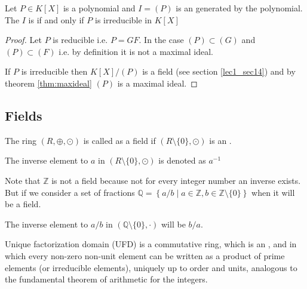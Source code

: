 \begin{appendices}
\begin{theorem}
  Let $P \in K\left[X\right]$ is a polynomial and $I = \left(P\right)$ is
  an  generated by the polynomial. The $I$ is
   if and only if $P$ is irreducible in
  $K\left[X\right]$
  \begin{proof}
    Let $P$ is reducible i.e. $P = G F$. In the case $(P) \subset (G)$
    and $(P) \subset (F)$ i.e. by definition it is not a maximal
    ideal.

    If $P$ is irreducible then $K\left[X\right]/(P)$ is a field (see
    section \ref{lec1_sec14}) and by theorem \ref{thm:maxideal} $(P)$
    is a maximal ideal.
  \end{proof}
  \label{thm:irreducibleideal}
\end{theorem}

\subsection{Fields}

\begin{definition}[Field]
  The ring $\left(R, \oplus, \odot\right)$ is called as a field if
  $\left(R \setminus \{0\}, \odot\right)$ is an .

  The inverse element to $a$ in
  $\left(R \setminus\{0\}, \odot\right)$ is denoted as $a^{-1}$
  \label{def:field}
\end{definition}

\begin{example}
  Note that $\mathbb{Z}$ is not a field because not for every integer
  number an inverse exists. But if we consider a set of fractions
  $\mathbb{Q} = \left\{a/b \mid a \in \mathbb{Z}, b \in
  \mathbb{Z}\setminus\{0\}\right\}$ when it will be a field.

  The
  inverse element to $a/b$  in
  $\left(\mathbb{Q}\setminus\{0\}, \cdot\right)$  will be $b/a$.
  \label{ex:field}
\end{example}

\begin{definition}
   Unique factorization domain (UFD) is a commutative ring, which is
   an , and in which every non-zero non-unit element
   can be written as a product of prime elements (or irreducible
   elements), uniquely up to order and units, analogous to the
   fundamental theorem of arithmetic for the integers. 
  \label{def:ufd}
\end{definition}


\end{appendices}
